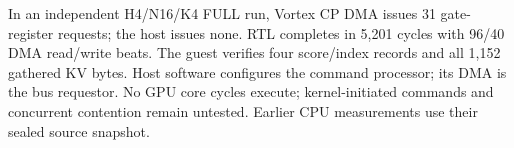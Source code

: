 In an independent H4/N16/K4 FULL run, Vortex CP DMA issues 31 gate-register requests; the host issues none. RTL completes in 5,201 cycles with 96/40 DMA read/write beats. The guest verifies four score/index records and all 1,152 gathered KV bytes. Host software configures the command processor; its DMA is the bus requestor. No GPU core cycles execute; kernel-initiated commands and concurrent contention remain untested. Earlier CPU measurements use their sealed source snapshot.

